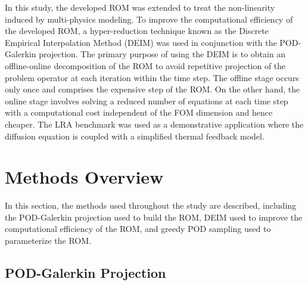 \documentclass[review,number,sort&compress,12pt]{elsarticle}
\begin{document}
In this study, the developed ROM was extended to treat the non-linearity induced by multi-physics modeling.
To improve the computational efficiency of the developed ROM, a hyper-reduction technique known as the Discrete Empirical Interpolation Method (DEIM) was used in conjunction with the POD-Galerkin projection.
The primary purpose of using the DEIM is to obtain an offline-online decomposition of the ROM to avoid repetitive projection of the problem operator at each iteration within the time step.
The offline stage occurs only once and comprises the expensive step of the ROM.
On the other hand, the online stage involves solving a reduced number of equations at each time step with a computational cost independent of the FOM dimension and hence cheaper.
The LRA benchmark was used as a demonstrative application where the diffusion equation is coupled with a simplified thermal feedback model.


\section{Methods Overview}

In this section, the methods used throughout the study are described, including the POD-Galerkin projection used to build the ROM, DEIM used to improve the computational efficiency of the ROM, and greedy POD sampling used to parameterize the ROM.


\subsection{POD-Galerkin Projection}
\label{sec:POD}
\end{document}
